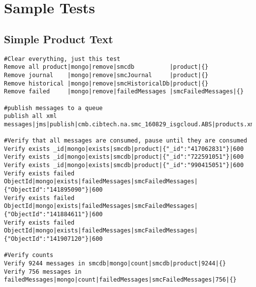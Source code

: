\documentclass[12pt,a4paper,koma]{article}
\begin{document}
\section{Sample Tests}
\label{sec-9}

\subsection{Simple Product Text}
\label{sec-9-1}
\begin{scriptsize}
\begin{verbatim}
#Clear everything, just this test
Remove all product|mongo|remove|smcdb          |product|{}
Remove journal    |mongo|remove|smcJournal     |product|{}
Remove historical |mongo|remove|smcHistoricalDb|product|{}
Remove failed     |mongo|remove|failedMessages |smcFailedMessages|{}

#publish messages to a queue
publish all xml messages|jms|publish|cmb.cibtech.na.smc_160829_isgcloud.ABS|products.xml

#Verify that all messages are consumed, pause until they are consumed
Verify exists _id|mongo|exists|smcdb|product|{"_id":"417062831"}|600
Verify exists _id|mongo|exists|smcdb|product|{"_id":"722591051"}|600
Verify exists _id|mongo|exists|smcdb|product|{"_id":"990415051"}|600
Verify exists failed ObjectId|mongo|exists|failedMessages|smcFailedMessages|{"ObjectId":"141895090"}|600
Verify exists failed ObjectId|mongo|exists|failedMessages|smcFailedMessages|{"ObjectId":"141884611"}|600
Verify exists failed ObjectId|mongo|exists|failedMessages|smcFailedMessages|{"ObjectId":"141907120"}|600

#Verify counts
Verify 9244 messages in smcdb|mongo|count|smcdb|product|9244|{}
Verify 756 messages in failedMessages|mongo|count|failedMessages|smcFailedMessages|756|{}
\end{verbatim}
\end{scriptsize}
\end{document}
